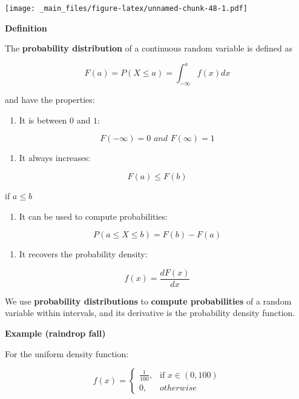 \documentclass[
]{book}
\providecommand{\tightlist}{%
  \setlength{\itemsep}{0pt}\setlength{\parskip}{0pt}}
\begin{document}
\texttt{[image: \_main\_files/figure-latex/unnamed-chunk-48-1.pdf]}

\textbf{Definition}

The \textbf{probability distribution} of a continuous random variable is defined as

\[F(a)=P(X\leq a) =\int_{-\infty} ^a f(x)dx\]

and have the properties:

\begin{enumerate}
\def\labelenumi{\arabic{enumi})}
\tightlist
\item
  It is between \(0\) and \(1\):
\end{enumerate}

\[F(-\infty)= 0 \,\, and \,\,F(\infty)=1\]

\begin{enumerate}
\def\labelenumi{\arabic{enumi})}
\setcounter{enumi}{1}
\tightlist
\item
  It always increases:
\end{enumerate}

\[F(a)\leq F(b)\]

if \(a\leq b\)

\begin{enumerate}
\def\labelenumi{\arabic{enumi})}
\setcounter{enumi}{2}
\tightlist
\item
  It can be used to compute probabilities:
\end{enumerate}

\[P(a \leq X \leq b)=F(b)-F(a)\]

\begin{enumerate}
\def\labelenumi{\arabic{enumi})}
\setcounter{enumi}{3}
\tightlist
\item
  It recovers the probability density:
\end{enumerate}

\[f(x)=\frac{dF(x)}{dx}\]

We use \textbf{probability distributions} to \textbf{compute probabilities} of a random variable within intervals, and its derivative is the probability density function.

\textbf{Example (raindrop fall)}

For the uniform density function:

\[
    f(x)= 
\begin{cases}
    \frac{1}{100},& \text{if } x\in (0,100)\\
    0,& otherwise 
\end{cases}
\]
\end{document}
